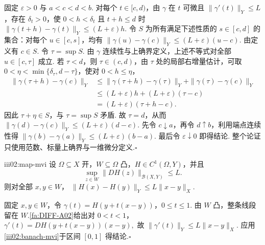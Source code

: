 \begin{FAProof}
固定 \(\displaystyle\varepsilon>0\) 与 \(\displaystyle a<c<d<b\). 对每个 \(\displaystyle t\in[c,d)\)，由 \(\displaystyle\gamma\) 在 \(\displaystyle t\) 可微且 \(\displaystyle\|\gamma'(t)\|_Y\leqslant L\)，存在 \(\displaystyle\delta_t>0\)，使 \(\displaystyle0<h<\delta_t\) 且 \(\displaystyle t+h\leqslant d\) 时
\(\displaystyle \|\gamma(t+h)-\gamma(t)\|_Y \leqslant (L+\varepsilon)h.\)
令 \(\displaystyle S\) 为所有满足下述性质的 \(\displaystyle s\in[c,d]\) 的集合：对每个 \(\displaystyle u\in[c,s]\)，均有
\(\displaystyle \|\gamma(u)-\gamma(c)\|_Y \leqslant (L+\varepsilon)(u-c).\)
由定义有 \(\displaystyle c\in S\). 令 \(\displaystyle\tau=\sup S\). 由 \(\displaystyle\gamma\) 连续性与上确界定义，上述不等式对全部 \(\displaystyle u\in[c,\tau]\) 成立. 若 \(\displaystyle\tau<d\)，则 \(\displaystyle\tau\in(c,d)\)，由 \(\displaystyle\tau\) 处的局部右增量估计，可取 \(\displaystyle0<\eta<\min\{\delta_\tau,d-\tau\}\)，使对 \(\displaystyle0<h\leqslant\eta\)，
\[
\begin{aligned}
\|\gamma(\tau+h)-\gamma(c)\|_Y
&\leqslant
\|\gamma(\tau+h)-\gamma(\tau)\|_Y
+
\|\gamma(\tau)-\gamma(c)\|_Y\\
&\leqslant
(L+\varepsilon)h+(L+\varepsilon)(\tau-c)\\
&=
(L+\varepsilon)(\tau+h-c).
\end{aligned}
\]
因此 \(\displaystyle\tau+\eta\in S\)，与 \(\displaystyle\tau=\sup S\) 矛盾. 故 \(\displaystyle\tau=d\)，从而
\(\displaystyle \|\gamma(d)-\gamma(c)\|_Y \leqslant (L+\varepsilon)(d-c).\)
先令 \(\displaystyle c\downarrow a\)，再令 \(\displaystyle d\uparrow b\)，利用端点连续性得
\(\displaystyle \|\gamma(b)-\gamma(a)\|_Y \leqslant (L+\varepsilon)(b-a).\)
最后令 \(\displaystyle\varepsilon\downarrow0\) 即得结论. 整个论证只使用范数、标量上确界与一维微分定义.\hfill\(\square\)

\end{FAProof}

\begin{FAProposition}{iii02:map-mvi}
设 \(\displaystyle\Omega\subseteq X\) 开，\(\displaystyle W\subseteq\Omega\) 凸，\(\displaystyle H\in C^1(\Omega,Y)\)，并且
\[
\sup_{z\in W}\|DH(z)\|_{\mathcal B(X,Y)}
\leqslant
L.
\]
则对全部 \(\displaystyle x,y\in W\)，
\(\displaystyle \|H(x)-H(y)\|_Y \leqslant L\|x-y\|_X.\)
\end{FAProposition}

\begin{FAProof}
固定 \(\displaystyle x,y\in W\)，令 \(\displaystyle\gamma(t)=H(y+t(x-y))\)，\(\displaystyle0\leqslant t\leqslant1\). 由 \(\displaystyle W\) 凸，整条线段留在 \(\displaystyle W\).\autoref{fa:DIFF-A02}给出对 \(\displaystyle0<t<1\)，
\(\displaystyle \gamma'(t) = DH(y+t(x-y))(x-y),\)
故 \(\displaystyle\|\gamma'(t)\|_Y\leqslant L\|x-y\|_X\). 应用\autoref{iii02:banach-mvi}于区间 \(\displaystyle[0,1]\) 得结论.\hfill\(\square\)

\end{FAProof}

